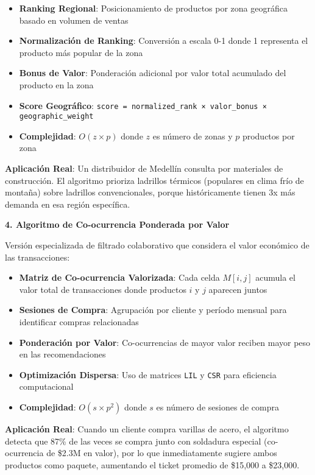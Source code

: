 \documentclass[twocolumn]{article}
\begin{document}
\begin{itemize}
    \item \textbf{Ranking Regional}: Posicionamiento de productos por zona geográfica basado en volumen de ventas
    \item \textbf{Normalización de Ranking}: Conversión a escala 0-1 donde 1 representa el producto más popular de la zona
    \item \textbf{Bonus de Valor}: Ponderación adicional por valor total acumulado del producto en la zona
    \item \textbf{Score Geográfico}: \texttt{score = normalized\_rank × valor\_bonus × geographic\_weight}
    \item \textbf{Complejidad}: \(O(z \times p)\) donde \(z\) es número de zonas y \(p\) productos por zona
\end{itemize}

\textbf{Aplicación Real}: Un distribuidor de Medellín consulta por materiales de construcción. El algoritmo prioriza ladrillos térmicos (populares en clima frío de montaña) sobre ladrillos convencionales, porque históricamente tienen 3x más demanda en esa región específica.

\textbf{4. Algoritmo de Co-ocurrencia Ponderada por Valor}

Versión especializada de filtrado colaborativo que considera el valor económico de las transacciones:

\begin{itemize}
    \item \textbf{Matriz de Co-ocurrencia Valorizada}: Cada celda \(M[i,j]\) acumula el valor total de transacciones donde productos \(i\) y \(j\) aparecen juntos
    \item \textbf{Sesiones de Compra}: Agrupación por cliente y período mensual para identificar compras relacionadas
    \item \textbf{Ponderación por Valor}: Co-ocurrencias de mayor valor reciben mayor peso en las recomendaciones
    \item \textbf{Optimización Dispersa}: Uso de matrices \texttt{LIL} y \texttt{CSR} para eficiencia computacional
    \item \textbf{Complejidad}: \(O(s \times p^2)\) donde \(s\) es número de sesiones de compra
\end{itemize}

\textbf{Aplicación Real}: Cuando un cliente compra varillas de acero, el algoritmo detecta que 87\% de las veces se compra junto con soldadura especial (co-ocurrencia de \$2.3M en valor), por lo que inmediatamente sugiere ambos productos como paquete, aumentando el ticket promedio de \$15,000 a \$23,000.
\end{document}
